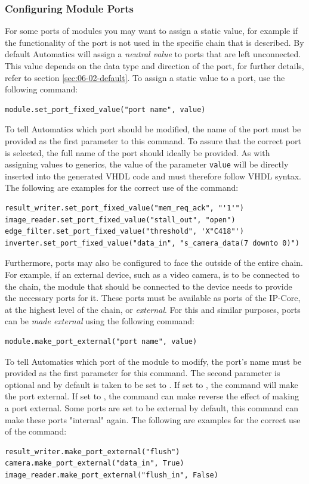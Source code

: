 \subsubsection{Configuring Module Ports}

For some ports of modules you may want to assign a static value, for example if the functionality of the port is not used in the specific chain that is described.
By default Automatics will assign a \textit{neutral value} to ports that are left unconnected.
This value depends on the data type and direction of the port, for further details, refer to section \ref{sec:06-02-default}.
To assign a static value to a port, use the following command:
\begin{lstlisting}[style=AutomaticsPython]
module.set_port_fixed_value("port name", value)
\end{lstlisting}
To tell Automatics which port should be modified, the name of the port must be provided as the first parameter to this command.
To assure that the correct port is selected, the full name of the port should ideally be provided.
As with assigning values to generics, the value of the parameter \texttt{value} will be directly inserted into the generated VHDL code and must therefore follow VHDL syntax.
The following are examples for the correct use of the command:
\begin{lstlisting}[style=AutomaticsPython]
result_writer.set_port_fixed_value("mem_req_ack", "'1'")
image_reader.set_port_fixed_value("stall_out", "open")
edge_filter.set_port_fixed_value("threshold", 'X"C418"')
inverter.set_port_fixed_value("data_in", "s_camera_data(7 downto 0)")
\end{lstlisting}

Furthermore, ports may also be configured to face the outside of the entire \asterics chain.
For example, if an external device, such as a video camera, is to be connected to the \asterics chain, the module that should be connected to the device needs to provide the necessary ports for it.
These ports must be available as ports of the \asterics IP-Core, at the highest level of the chain, or \textit{external}.
For this and similar purposes, ports can be \textit{made external} using the following command:
\begin{lstlisting}[style=AutomaticsPython]
module.make_port_external("port name", value)
\end{lstlisting}
To tell Automatics which port of the module to modify, the port's name must be provided as the first parameter for this command.
The second parameter is optional and by default is taken to be set to .
If set to , the command will make the port external.
If set to , the command can make reverse the effect of making a port external.
Some ports are set to be external by default, this command can make these ports "internal" again.
The following are examples for the correct use of the command:
\begin{lstlisting}[style=AutomaticsPython]
result_writer.make_port_external("flush")
camera.make_port_external("data_in", True)
image_reader.make_port_external("flush_in", False)
\end{lstlisting}

